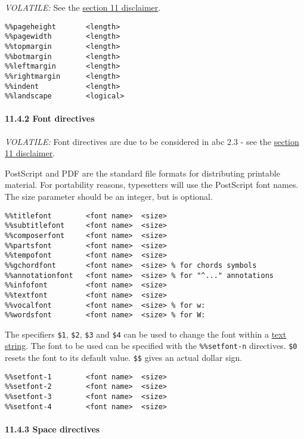 \emph{VOLATILE:} See the \protect\hyperlink{disclaimer}{section 11
disclaimer}.

\begin{verbatim}
%%pageheight       <length>
%%pagewidth        <length>
%%topmargin        <length>
%%botmargin        <length>
%%leftmargin       <length>
%%rightmargin      <length>
%%indent           <length>
%%landscape        <logical>
\end{verbatim}

\hypertarget{font_directives}{\paragraph{11.4.2 Font
directives}\label{font_directives}}

\emph{VOLATILE:} Font directives are due to be considered in abc 2.3 -
see the \protect\hyperlink{disclaimer}{section 11 disclaimer}.

PostScript and PDF are the standard file formats for distributing
printable material. For portability reasons, typesetters will use the
PostScript font names. The size parameter should be an integer, but is
optional.

\begin{verbatim}
%%titlefont        <font name>  <size>
%%subtitlefont     <font name>  <size>
%%composerfont     <font name>  <size>
%%partsfont        <font name>  <size>
%%tempofont        <font name>  <size>
%%gchordfont       <font name>  <size> % for chords symbols
%%annotationfont   <font name>  <size> % for "^..." annotations
%%infofont         <font name>  <size>
%%textfont         <font name>  <size>
%%vocalfont        <font name>  <size> % for w:
%%wordsfont        <font name>  <size> % for W:
\end{verbatim}

The specifiers \texttt{\$1}, \texttt{\$2}, \texttt{\$3} and \texttt{\$4}
can be used to change the font within a
\protect\hyperlink{text_string_definition}{text string}. The font to be
used can be specified with the \texttt{\%\%setfont-n} directives.
\texttt{\$0} resets the font to its default value. \texttt{\$\$} gives
an actual dollar sign.

\begin{verbatim}
%%setfont-1        <font name>  <size>
%%setfont-2        <font name>  <size>
%%setfont-3        <font name>  <size>
%%setfont-4        <font name>  <size>
\end{verbatim}

\hypertarget{space_directives}{\paragraph{11.4.3 Space
directives}\label{space_directives}}

